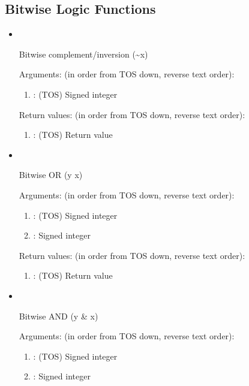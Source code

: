 \subsection{Bitwise Logic Functions}
\begin{itemize}

\item \forthinlinehl{{\~}}\ 

\noindent Bitwise complement/inversion ({\textasciitilde}x)

\noindent Arguments: (in order from TOS down, reverse text order):
\begin{enumerate}
\item {}: (TOS) Signed integer
\end{enumerate}

\noindent Return values: (in order from TOS down, reverse text order):
\begin{enumerate}
\item {}: (TOS) Return value
\end{enumerate}

\item \forthinlinehl{|}\ 

\noindent Bitwise OR (y {\textbar} x)

\noindent Arguments: (in order from TOS down, reverse text order):
\begin{enumerate}
\item {}: (TOS) Signed integer
\item {}: Signed integer
\end{enumerate}

\noindent Return values: (in order from TOS down, reverse text order):
\begin{enumerate}
\item {}: (TOS) Return value
\end{enumerate}

\item \forthinlinehl{&}\ 

\noindent Bitwise AND (y {\&} x)

\noindent Arguments: (in order from TOS down, reverse text order):
\begin{enumerate}
\item {}: (TOS) Signed integer
\item {}: Signed integer
\end{enumerate}


\end{itemize}
